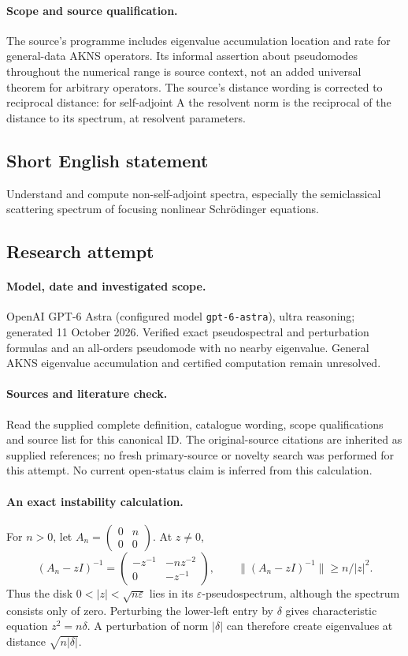 \documentclass[11pt]{article}
\begin{document}
\paragraph{Scope and source qualification.}The source’s programme includes eigenvalue accumulation location and rate for general-data AKNS operators. Its informal assertion about pseudomodes throughout the numerical range is source context, not an added universal theorem for arbitrary operators. The source’s distance wording is corrected to reciprocal distance: for self-adjoint A the resolvent norm is the reciprocal of the distance to its spectrum, at resolvent parameters.
\subsection{Short English statement}
Understand and compute non-self-adjoint spectra, especially the semiclassical scattering spectrum of focusing nonlinear Schrödinger equations.
\subsection{Research attempt}
\paragraph{Model, date and investigated scope.}
OpenAI GPT-6 Astra (configured model \texttt{gpt-6-astra}), ultra reasoning; generated 11 October 2026. Verified exact pseudospectral and perturbation formulas and an all-orders pseudomode with no nearby eigenvalue. General AKNS eigenvalue accumulation and certified computation remain unresolved.

\paragraph{Sources and literature check.}
Read the supplied complete definition, catalogue wording, scope qualifications and source list for this canonical ID. The original-source citations are inherited as supplied references; no fresh primary-source or novelty search was performed for this attempt. No current open-status claim is inferred from this calculation.

\paragraph{An exact instability calculation.}For \(n>0\), let \(A_n=\begin{pmatrix}0&n\\0&0\end{pmatrix}\). At \(z\ne0\),
\[(A_n-zI)^{-1}=\begin{pmatrix}-z^{-1}&-nz^{-2}\\0&-z^{-1}\end{pmatrix},\qquad
\|(A_n-zI)^{-1}\|\ge n/|z|^2.
\]
Thus the disk \(0<|z|<\sqrt{n\varepsilon}\) lies in its \(\varepsilon\)-pseudospectrum, although the spectrum consists only of zero. Perturbing the lower-left entry by \(\delta\) gives characteristic equation \(z^2=n\delta\). A perturbation of norm \(|\delta|\) can therefore create eigenvalues at distance \(\sqrt{n|\delta|}\).
\end{document}
